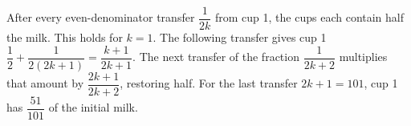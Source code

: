 After every even-denominator transfer $\dfrac{1}{2k}$ from cup 1, the cups each contain half the milk. This holds for $k=1$. The following transfer gives cup 1 $\dfrac{1}{2}+\dfrac{1}{2(2k+1)}=\dfrac{k+1}{2k+1}$. The next transfer of the fraction $\dfrac{1}{2k+2}$ multiplies that amount by $\dfrac{2k+1}{2k+2}$, restoring half. For the last transfer $2k+1=101$, cup 1 has $\boxed{\dfrac{51}{101}}$ of the initial milk.
